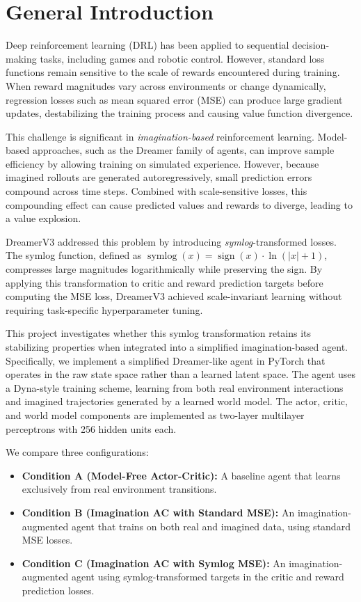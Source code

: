 \chapter*{General Introduction}
\label{ch:intoGen}

Deep reinforcement learning (DRL) has been applied to sequential decision-making tasks, including games and robotic control. However, standard loss functions remain sensitive to the scale of rewards encountered during training. When reward magnitudes vary across environments or change dynamically, regression losses such as mean squared error (MSE) can produce large gradient updates, destabilizing the training process and causing value function divergence.

This challenge is significant in \emph{imagination-based} reinforcement learning. Model-based approaches, such as the Dreamer family of agents, can improve sample efficiency by allowing training on simulated experience. However, because imagined rollouts are generated autoregressively, small prediction errors compound across time steps. Combined with scale-sensitive losses, this compounding effect can cause predicted values and rewards to diverge, leading to a value explosion.

DreamerV3 addressed this problem by introducing \emph{symlog}-transformed losses. The symlog function, defined as $\operatorname{symlog}(x) = \operatorname{sign}(x) \cdot \ln(|x| + 1)$, compresses large magnitudes logarithmically while preserving the sign. By applying this transformation to critic and reward prediction targets before computing the MSE loss, DreamerV3 achieved scale-invariant learning without requiring task-specific hyperparameter tuning.

This project investigates whether this symlog transformation retains its stabilizing properties when integrated into a simplified imagination-based agent. Specifically, we implement a simplified Dreamer-like agent in PyTorch that operates in the raw state space rather than a learned latent space. The agent uses a Dyna-style training scheme, learning from both real environment interactions and imagined trajectories generated by a learned world model. The actor, critic, and world model components are implemented as two-layer multilayer perceptrons with 256 hidden units each.

We compare three configurations:
\begin{itemize}
    \item \textbf{Condition A (Model-Free Actor-Critic):} A baseline agent that learns exclusively from real environment transitions.
    \item \textbf{Condition B (Imagination AC with Standard MSE):} An imagination-augmented agent that trains on both real and imagined data, using standard MSE losses.
    \item \textbf{Condition C (Imagination AC with Symlog MSE):} An imagination-augmented agent using symlog-transformed targets in the critic and reward prediction losses.
\end{itemize}

